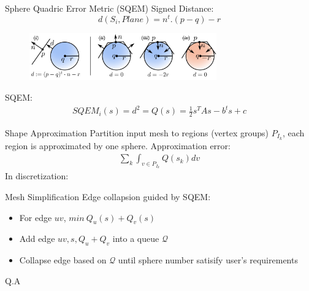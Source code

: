 \documentclass{beamer}
\begin{document}
\begin{frame}{Sphere Quadric Error Metric (SQEM)}
Signed Distance:
\[d(S_i,Plane)=n^t.(p-q)-r\]
\begin{figure}
\vspace{-4mm}
\includegraphics[height=0.8in]{./img/distance.png}
\end{figure}
SQEM:
\begin{eqnarray}
SQEM_i(s) = d^2 = Q(s) = \frac{1}{2}s^TAs-b^ts+c
\end{eqnarray}
\end{frame}

\begin{frame}{Shape Approximation}
Partition input mesh to regions (vertex groups) $P_{I_k}$, each region is approximated by one sphere.
Approximation error:
\begin{eqnarray}
\sum_k \int_{v\in P_{I_k}} Q(s_k) dv
\end{eqnarray}
In discretization:
\end{frame}

\begin{frame}{Mesh Simplification}
Edge collapsion guided by SQEM:
\begin{itemize}
\item For edge $uv$, $min\: Q_u(s) + Q_v(s)$
\item Add edge $uv, s, Q_u+Q_v$ into a queue $\mathcal{Q}$
\item Collapse edge based on $\mathcal{Q}$ until sphere number satisify user's requirements
\end{itemize}
\end{frame}

\begin{frame}{Q.A}
\end{frame}
\end{document}
